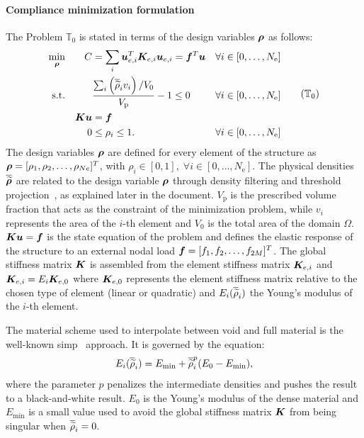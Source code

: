 \paragraph{Compliance minimization formulation} The Problem $\mathbb{T}_0$ is stated in terms of the design variables $\bm{\rho}$ as follows:
\begin{equation}
    \begin{aligned}
    \min_{\vect{\rho}}         && C &= \sum_{i} \vect{u}_{e,i}^T \matr{K}_{e,i} \vect{u}_{e,i}=\vect{f}^T\vect{u}&& \forall i \in [0,\dots,N_\text{e}]                         \\
    \textrm{s.t.}   && & \frac{\sum_{i} \left(\rhophys_i v_i \right) / V_0}{V_\text{p}} - 1 \leq 0 && \forall i \in [0,\dots,N_\text{e}] \\
    && \matr{K}\vect{u} &= \vect{f} &&\\
    && 0 &\leq \rho_i \leq 1. && \forall i \in [0,\dots,N_\text{e}] \\
    \end{aligned}
    \tag{$\mathbb{T}_0$}
    \label{eq:02_prob-comp}
\end{equation}
The design variables $\bm{\rho}$ are defined for every element of the structure as $\bm{\rho} = [\rho_1, \rho_2, \ldots,\rho_{Ne}]^T$, with $\rho_i \in [0,1], \; \forall i \in [0,\dots,N_\text{e}]$. The physical densities $\bm{\overline{\widetilde{\rho}}}$ are related to the design variable $\bm{\rho}$ through density filtering and threshold projection~, as explained later in the document. $V_\text{p}$ is the prescribed volume fraction that acts as the constraint of the minimization problem, while $v_i$ represents the area of the $i$-th element and $V_0$ is the total area of the domain $\Omega$. $\bm{K}\bm{u} = \bm{f}$ is the state equation of the problem and defines the elastic response of the structure to an external nodal load $\bm{f}=[f_1, f_2, \ldots,f_{2M}]^T$. The global stiffness matrix $\bm{K}$ is assembled from the element stiffness matrix $\bm{K}_{e,i}$ and $\bm{K}_{e,i} = E_i \bm{K}_{e,0}$ where $\bm{K}_{e,0}$ represents the element stiffness matrix relative to the chosen type of element (linear or quadratic) and $E_i(\overline{\widetilde{\rho}}_i)$ the Young's modulus of the $i$-th element. 

The material scheme used to interpolate between void and full material is the well-known \gls{simp}~ approach. It is governed by the equation:
\begin{equation}
    E_i(\overline{\widetilde{\rho}}_i) = E_{\textrm{min}} + \overline{\widetilde{\rho}}_i^p(E_0-E_{\textrm{min}}),
    \label{eq:02_simp}
\end{equation}
where the parameter $p$ penalizes the intermediate densities and pushes the result to a black-and-white result. $E_0$ is the Young's modulus of the dense material and $E_{\textrm{min}}$ is a small value used to avoid the global stiffness matrix $\bm{K}$ from being singular when $\overline{\widetilde{\rho}}_i=0$. 

